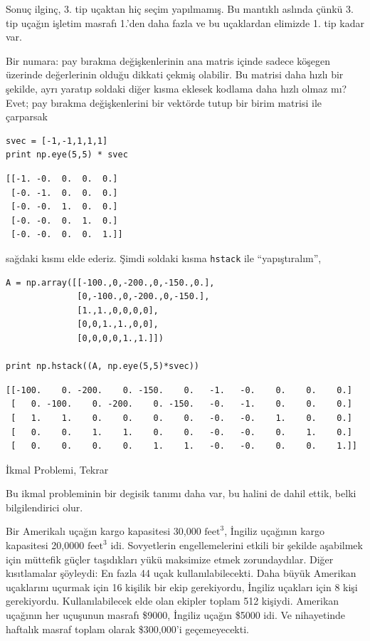 \documentclass[12pt,fleqn]{article}\usepackage{../../common}
\begin{document}
Sonuç ilginç, 3. tip uçaktan hiç seçim yapılmamış. Bu mantıklı aslında çünkü
3. tip uçağın işletim masrafı 1.'den daha fazla ve bu uçaklardan elimizde 1. tip
kadar var.

Bir numara: pay bırakma değişkenlerinin ana matris içinde sadece köşegen
üzerinde değerlerinin olduğu dikkati çekmiş olabilir. Bu matrisi daha hızlı bir
şekilde, ayrı yaratıp soldaki diğer kısma eklesek kodlama daha hızlı olmaz mı?
Evet; pay bırakma değişkenlerini bir vektörde tutup bir birim matrisi ile
çarparsak

\begin{verbatim}
svec = [-1,-1,1,1,1]
print np.eye(5,5) * svec
\end{verbatim}

\begin{verbatim}
[[-1. -0.  0.  0.  0.]
 [-0. -1.  0.  0.  0.]
 [-0. -0.  1.  0.  0.]
 [-0. -0.  0.  1.  0.]
 [-0. -0.  0.  0.  1.]]
\end{verbatim}

sağdaki kısmı elde ederiz. Şimdi soldaki kısma \verb!hstack! ile ``yapıştıralım'',

\begin{verbatim}
A = np.array([[-100.,0,-200.,0,-150.,0.],
              [0,-100.,0,-200.,0,-150.],
              [1.,1.,0,0,0,0],
              [0,0,1.,1.,0,0],
              [0,0,0,0,1.,1.]])

print np.hstack((A, np.eye(5,5)*svec)) 
\end{verbatim}
	      
\begin{verbatim}
[[-100.    0. -200.    0. -150.    0.   -1.   -0.    0.    0.    0.]
 [   0. -100.    0. -200.    0. -150.   -0.   -1.    0.    0.    0.]
 [   1.    1.    0.    0.    0.    0.   -0.   -0.    1.    0.    0.]
 [   0.    0.    1.    1.    0.    0.   -0.   -0.    0.    1.    0.]
 [   0.    0.    0.    0.    1.    1.   -0.   -0.    0.    0.    1.]]
\end{verbatim}

İkmal Problemi, Tekrar

Bu ikmal probleminin bir degisik tanımı daha var, bu halini de dahil ettik,
belki bilgilendirici olur.

Bir Amerikalı uçağın kargo kapasitesi 30,000 $\textrm{feet}^3$, İngiliz uçağının
kargo kapasitesi 20,0000 $\textrm{feet}^3$ idi. Sovyetlerin engellemelerini
etkili bir şekilde aşabilmek için müttefik güçler taşıdıkları yükü maksimize
etmek zorundaydılar. Diğer kısıtlamalar şöyleydi: En fazla 44 uçak
kullanılabilecekti. Daha büyük Amerikan uçaklarını uçurmak için 16 kişilik bir
ekip gerekiyordu, İngiliz uçakları için 8 kişi gerekiyordu. Kullanılabilecek
elde olan ekipler toplam 512 kişiydi. Amerikan uçağının her uçuşunun masrafı
\$9000, İngiliz uçağın \$5000 idi. Ve nihayetinde haftalık masraf toplam olarak
\$300,000'i geçemeyecekti.
\end{document}
